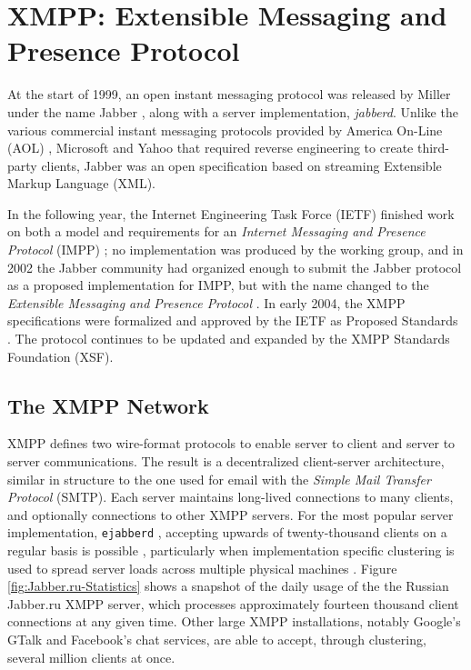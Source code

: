 \chapter{XMPP: Extensible Messaging and Presence Protocol}
\label{chap:XMPP}

At the start of 1999, an open instant messaging protocol was released by Miller
under the name Jabber \cite{XSF-History}, along with a server implementation,
\textit{jabberd}. Unlike the various commercial instant messaging protocols
provided by America On-Line (AOL) \cite{AIM}, Microsoft \cite{MSN} and Yahoo
\cite{Yahoo} that required reverse engineering to create third-party clients,
Jabber was an open specification based on streaming Extensible Markup Language
(XML).

In the following year, the Internet Engineering Task Force (IETF) finished work
on both a model and requirements for an \textit{Internet Messaging and Presence
Protocol} (IMPP) \cite{RFC2778}\cite{RFC2779}; no implementation was produced
by the working group, and in 2002 the Jabber community had organized enough
to submit the Jabber protocol as a proposed implementation for IMPP, but with
the name changed to the \textit{Extensible Messaging and Presence Protocol}
\cite{RFC3920}\cite{RFC3921}. In early 2004, the XMPP specifications were
formalized and approved by the IETF as Proposed Standards \cite{XSF-History}.
The protocol continues to be updated and expanded by the XMPP Standards
Foundation (XSF).

\section{The XMPP Network}
\label{sec:The-XMPP-Network}

XMPP defines two wire-format protocols to enable server to client and server to
server communications. The result is a decentralized client-server architecture,
similar in structure to the one used for email with the \textit{Simple Mail
Transfer Protocol} (SMTP). Each server maintains long-lived connections
to many clients, and optionally connections to other XMPP servers. For
the most popular server implementation, \texttt{ejabberd} \cite{ejabberd}
\cite{XSF-Services}, accepting upwards of twenty-thousand clients on a regular
basis is possible \cite{JabberRu}, particularly when implementation specific
clustering is used to spread server loads across multiple physical machines
\cite{ejabberd-cluster}. Figure \ref{fig:Jabber.ru-Statistics} shows a snapshot
of the daily usage of the the Russian Jabber.ru XMPP server, which processes
approximately fourteen thousand client connections at any given time. Other
large XMPP installations, notably Google's GTalk \cite{GTalk} and Facebook's
chat \cite{Facebook} services, are able to accept, through clustering, several
million clients at once.

